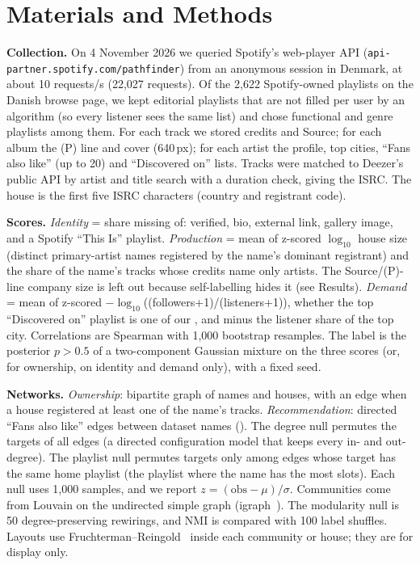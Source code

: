 \documentclass[9pt,twocolumn,twoside]{pnas-new}
\begin{document}
\section*{Materials and Methods}
\small
\textbf{Collection.} On 4 November 2026 we queried Spotify's web-player API (\texttt{api-partner.spotify.com/pathfinder}) from an anonymous session in Denmark, at about 10 requests/s (22,027 requests). Of the 2,622 Spotify-owned playlists on the Danish browse page, we kept editorial playlists that are not filled per user by an algorithm (so every listener sees the same list) and chose \nFunctional{} functional and \nGenre{} genre playlists among them. For each track we stored credits and Source; for each album the (P) line and cover (640\,px); for each artist the profile, top cities, ``Fans also like'' (up to 20) and ``Discovered on'' lists. Tracks were matched to Deezer's public API by artist and title search with a duration check, giving the ISRC. The house is the first five ISRC characters (country and registrant code).

\textbf{Scores.} \emph{Identity} = share missing of: verified, bio, external link, gallery image, and a Spotify ``This Is'' playlist. \emph{Production} = mean of z-scored $\log_{10}$ house size (distinct primary-artist names registered by the name's dominant registrant) and the share of the name's tracks whose credits name only artists. The Source/(P)-line company size is left out because self-labelling hides it (see Results). \emph{Demand} = mean of z-scored $-\log_{10}$((followers+1)/(listeners+1)), whether the top ``Discovered on'' playlist is one of our \nPlaylists, and minus the listener share of the top city. Correlations are Spearman with 1,000 bootstrap resamples. The label is the posterior $p>0.5$ of a two-component Gaussian mixture on the three scores (or, for ownership, on identity and demand only), with a fixed seed.

\textbf{Networks.} \emph{Ownership}: bipartite graph of names and houses, with an edge when a house registered at least one of the name's tracks. \emph{Recommendation}: directed ``Fans also like'' edges between dataset names (\nFalIn). The degree null permutes the targets of all edges (a directed configuration model that keeps every in- and out-degree). The playlist null permutes targets only among edges whose target has the same home playlist (the playlist where the name has the most slots). Each null uses 1,000 samples, and we report $z=(\mathrm{obs}-\mu)/\sigma$. Communities come from Louvain on the undirected simple graph (igraph~\cite{csardi2006igraph}). The modularity null is 50 degree-preserving rewirings, and NMI is compared with 100 label shuffles. Layouts use Fruchterman--Reingold~\cite{fruchterman1991} inside each community or house; they are for display only.
\end{document}
